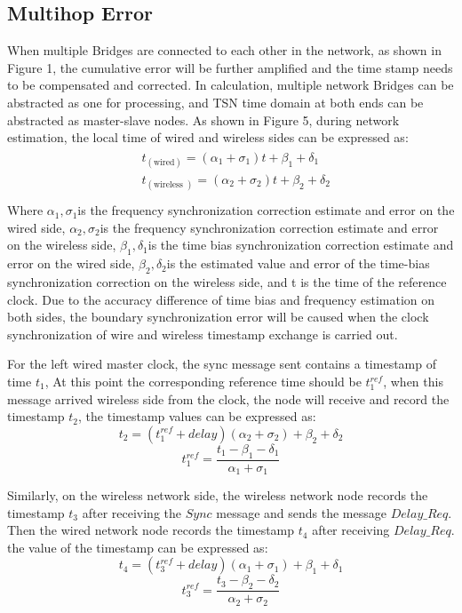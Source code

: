 \documentclass[english]{cccconf}
\begin{document}
\subsection{Multihop Error}
When multiple Bridges are connected to each other in the network, as shown in Figure 1, the cumulative error will be further amplified and the time stamp needs to be compensated and corrected. In calculation, multiple network Bridges can be abstracted as one for processing, and TSN time domain at both ends can be abstracted as master-slave nodes.
As shown in Figure 5, during network estimation, the local time of wired and wireless sides can be expressed as:
\begin{eqnarray}
	\begin{aligned}
		&t_{(\text {wired})}=\left(\alpha_{1}+\sigma_{1}\right) t+\beta_{1}+\delta_{1}\\
		&t_{(\text {wireless })}=\left(\alpha_{2}+\sigma_{2}\right) t+\beta_{2}+\delta_{2}\\
	\end{aligned}
\end{eqnarray}
Where $\alpha_1,\sigma_{1}$is the frequency synchronization correction estimate and error on the wired side, $\alpha_2,\sigma_{2}$is the frequency synchronization correction estimate and error on the wireless side, $\beta_1,\delta_{1}$is the time bias synchronization correction estimate and error on the wired side, $\beta_2,\delta_{2}$is the estimated value and error of the time-bias synchronization correction on the wireless side, and t is the time of the reference clock. Due to the accuracy difference of time bias and frequency estimation on both sides, the boundary synchronization error will be caused when the clock synchronization of wire and wireless timestamp exchange is carried out.

For the left wired master clock, the sync message sent contains a timestamp of time $t_1$, At this point the corresponding reference time should be $t_1^{ref}$, when this message arrived wireless side from the clock, the node will receive and record the timestamp $t_2$, the timestamp values can be expressed as: 
\begin{equation}
	t_{2}=(t_1^{ref}+delay)(\alpha_{2}+\sigma_{2})+\beta_{2}+\delta_{2}
\end{equation}
\begin{equation}
	t_1^{ref}=\frac{t_{1}-\beta_{1}-\delta_{1}}{\alpha_{1}+\sigma_{1}}
\end{equation}

Similarly, on the wireless network side, the wireless network node records the timestamp $t_3$ after receiving the $Sync$ message and sends the message $Delay\_Req$. Then the wired network node records the timestamp $t_4$ after receiving $Delay\_Req$. the value of the timestamp can be expressed as:
\begin{equation}
	t_{4}=(t_3^{ref}+delay)(\alpha_{1}+\sigma_{1})+\beta_{1}+\delta_{1}
\end{equation}
\begin{equation}
	t_3^{ref}=\frac{t_{3}-\beta_{2}-\delta_{2}}{\alpha_{2}+\sigma_{2}}
\end{equation}
\end{document}
